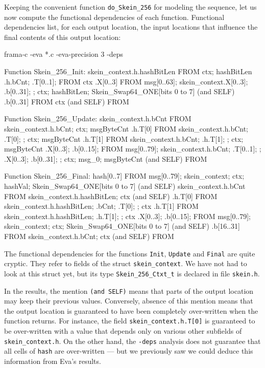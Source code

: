 \documentclass[web]{frama-c-book}
\newcommand{\Eva}{\textsf{Eva}}
\begin{document}
Keeping the convenient function \lstinline|do_Skein_256| for modeling the
sequence, let us now compute the functional dependencies of each function.
Functional dependencies list, for each output location, 
the input locations that influence the final contents of this output location:
\begin{shell}
frama-c -eva *.c -eva-precision 3 -deps
\end{shell}
\begin{logs}
Function Skein_256_Init:
  skein_context.h.hashBitLen FROM ctx; hashBitLen
               .h{.bCnt; .T[0..1]; } FROM ctx
               .X[0..3] FROM msg[0..63];
                             skein_context{.X[0..3]; .b[0..31]; }; ctx;
                             hashBitLen; Skein_Swap64_ONE[bits 0 to 7] (and SELF)
               .b[0..31] FROM ctx (and SELF)
  \result FROM \nothing

Function Skein_256_Update:
  skein_context.h.bCnt FROM skein_context.h.bCnt; ctx; msgByteCnt
               .h.T[0] FROM skein_context.h{.bCnt; .T[0]; }; ctx; msgByteCnt
               .h.T[1] FROM skein_context{.h.bCnt; .h.T[1]; }; ctx;
                            msgByteCnt
               {.X[0..3]; .b[0..15]; } FROM msg[0..79];
                                            skein_context{.h{.bCnt; .T[0..1]; };
                                                          .X[0..3]; .b[0..31]; };
                                             ctx; msg_0; msgByteCnt (and SELF)
  \result FROM \nothing

Function Skein_256_Final:
  hash[0..7] FROM msg[0..79]; skein_context; ctx; 
                  hashVal; Skein_Swap64_ONE[bits 0 to 7] (and SELF)
  skein_context.h.bCnt FROM skein_context.h.hashBitLen; ctx (and SELF)
               .h.T[0] FROM skein_context.h{.hashBitLen; .bCnt; .T[0]; }; ctx
               .h.T[1] FROM skein_context{.h.hashBitLen; .h.T[1]; }; ctx
               {.X[0..3]; .b[0..15]; } FROM msg[0..79]; skein_context; 
                                            ctx; Skein_Swap64_ONE[bits 0 to 7] (and SELF)
               .b[16..31] FROM skein_context.h.bCnt; ctx (and SELF)
  \result FROM \nothing
\end{logs}
The functional dependencies for the functions \lstinline|Init|,
\lstinline|Update| and \lstinline|Final| are quite cryptic. They refer
to fields of the struct \lstinline|skein_context|. We have not had
to look at this struct yet, but its type \lstinline|Skein_256_Ctxt_t|
is declared in file \verb|skein.h|. 

In the results, the mention \verb|(and SELF)| means that parts of the output
location may keep their previous values. Conversely, absence of this
mention means that the output location is guaranteed to have been completely
over-written when the function returns.
For instance, the field \lstinline|skein_context.h.T[0]| is
guaranteed to be over-written with a value that depends only on
various other subfields of \lstinline|skein_context.h|. On the other
hand, the \verb|-deps| analysis does not guarantee that all cells of
\verb|hash| are over-written --- but we previously saw we
could deduce this information from \Eva{}'s results.
\end{document}
